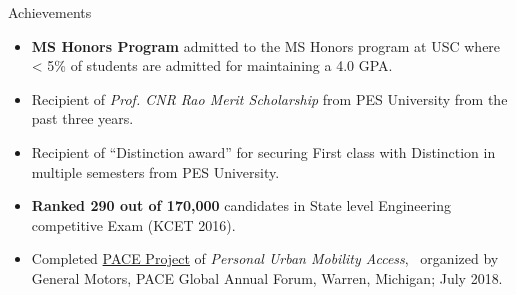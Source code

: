 \documentclass{CV} %
\begin{document}
\begin{rSection}{Achievements}

  \begin{itemize}

  \item \textbf{MS Honors Program} admitted to the MS Honors program at USC where < 5\% of students are admitted for maintaining a 4.0 GPA.

  \item Recipient of \textit{Prof. CNR Rao Merit Scholarship} from PES University from the past three years.

  \item Recipient of ``Distinction award'' for securing First class with Distinction in multiple semesters from PES University.
    
  \item \textbf{Ranked 290 out of 170,000} candidates in State level Engineering competitive Exam (KCET 2016).

  \item Completed \href{https://youtu.be/khK5RrpkqZM}{PACE Project} of \textit{Personal Urban Mobility Access}, \
    organized by General Motors, PACE Global Annual Forum, Warren, Michigan; July 2018.
    
  \end{itemize}
  
\end{rSection}




\end{document}
